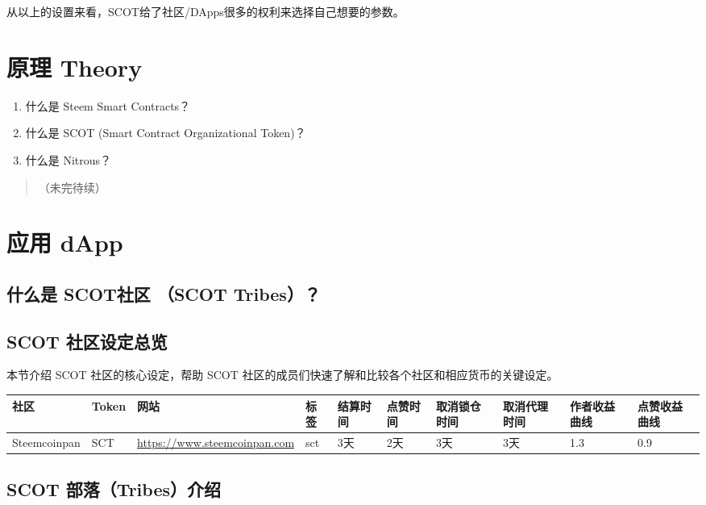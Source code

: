 \documentclass[]{ctexbook}
\providecommand{\tightlist}{%
  \setlength{\itemsep}{0pt}\setlength{\parskip}{0pt}}
\begin{document}
从以上的设置来看，SCOT给了社区/DApps很多的权利来选择自己想要的参数。

\hypertarget{theory}{%
\chapter{原理 Theory}\label{theory}}

\begin{enumerate}
\def\labelenumi{\arabic{enumi}.}
\tightlist
\item
  什么是 Steem Smart Contracts？
\item
  什么是 SCOT (Smart Contract Organizational Token)？
\item
  什么是 Nitrous？
\end{enumerate}

\begin{quote}
（未完待续）
\end{quote}

\hypertarget{dapp}{%
\chapter{应用 dApp}\label{dapp}}

\hypertarget{whats-tribes}{%
\section{什么是 SCOT社区 （SCOT Tribes）？}\label{whats-tribes}}

\hypertarget{tribes-config}{%
\section{SCOT 社区设定总览}\label{tribes-config}}

本节介绍 SCOT 社区的核心设定，帮助 SCOT 社区的成员们快速了解和比较各个社区和相应货币的关键设定。

\begin{longtable}[]{@{}llllllllll@{}}
\toprule
社区 & Token & 网站 & 标签 & 结算时间 & 点赞时间 & 取消锁仓时间 & 取消代理时间 & 作者收益曲线 & 点赞收益曲线\tabularnewline
\midrule
\endhead
Steemcoinpan & SCT & \url{https://www.steemcoinpan.com} & sct & 3天 & 2天 & 3天 & 3天 & 1.3 & 0.9\tabularnewline
\bottomrule
\end{longtable}

\hypertarget{intro-to-tribes}{%
\section{SCOT 部落（Tribes）介绍}\label{intro-to-tribes}}
\end{document}

